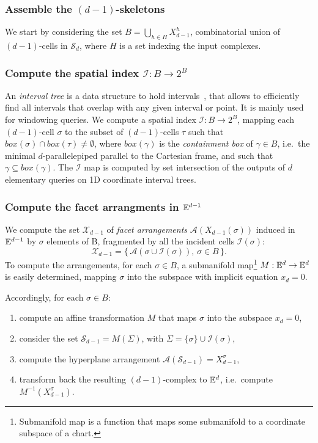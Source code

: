 \subsubsection{Assemble the $(d-1)$-skeletons}

We start by considering the set $B = \bigcup_{h\in H} X^h_{d-1}$, combinatorial union of
$(d-1)$-cells in $\mathcal{S}_d$, where $H$ is
a set indexing the input complexes.

\subsubsection{Compute the spatial index $\mathcal{I}: B\to 2^B$}
\label{sec:sigma}

An \emph{interval tree} is a  data structure to hold intervals~\cite{Preparata:1985:CGI:4333}, that allows to efficiently find all intervals that overlap with any given interval or point. It is mainly used for windowing queries.
We compute a spatial index $\mathcal{I}: B\to 2^B$, mapping each
$(d-1)$-cell $\sigma$ to the subset of $(d-1)$-cells $\tau$ such
that $\mathit{box}(\sigma)\cap \mathit{box}(\tau) \not= \emptyset$, where $\mathit{box}(\gamma)$ is the \emph{containment \mbox{box}} of $\gamma\in B$, i.e.~the minimal $d$-parallelepiped parallel to the Cartesian frame, and such that $\gamma\subseteq \mathit{box}(\gamma)$. The $\mathcal{I}$ map is computed by set intersection of the outputs of $d$ elementary queries on 1D coordinate interval trees. 


\subsubsection{Compute the facet arrangments in $\mathbb{E}^{d-1}$}
\label{sec:facet-arrangment}

We compute the set $\mathcal{X}_{d-1}$ of \emph{facet arrangements} $\mathcal{A}(X_{d-1}(\sigma))$ induced in $\mathbb{E}^{d-1}$ by $\sigma$ elements of B, fragmented by all the incident cells $\mathcal{I}(\sigma)$:
$$
\mathcal{X}_{d-1} = \{\, \mathcal{A}(\sigma \cup \mathcal{I}(\sigma)),\, \sigma\in B \,\}.
$$ 
To compute the arrangements, for each $\sigma \in B$, a submanifold map\footnote{Submanifold map is a function that maps some submanifold to a coordinate subspace of a chart.} $M: \mathbb{E}^d \to \mathbb{E}^d$ is easily determined, mapping $\sigma$ into the subspace with implicit equation $x_d=0$.

Accordingly, for each $\sigma \in B$:
\begin{enumerate}
\item
  compute an affine transformation $M$ that maps $\sigma$ into the
  subspace $x_d=0$,
\item
  consider the set $\mathcal{S}_{d-1} = M(\Sigma)$, with
  $\Sigma = \{ \sigma \} \cup \mathcal{I}( \sigma )$,
\item
  compute the hyperplane arrangement
  $\mathcal{A}(\mathcal{S}_{d-1}) = X_{d-1}^\sigma$,
\item
  transform back the resulting $(d-1)$-complex to $\mathbb{E}^d$, i.e.~compute
  $M^{-1}(X_{d-1}^\sigma)$.
\end{enumerate}

